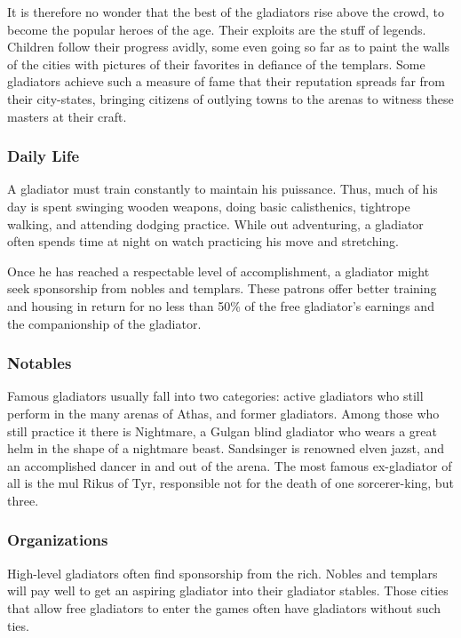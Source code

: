 It is therefore no wonder that the best of the gladiators rise above the crowd, to become the popular heroes of the age. Their exploits are the stuff of legends. Children follow their progress avidly, some even going so far as to paint the walls of the cities with pictures of their favorites in defiance of the templars. Some gladiators achieve such a measure of fame that their reputation spreads far from their city-states, bringing citizens of outlying towns to the arenas to witness these masters at their craft.

\subsubsection{Daily Life}
A gladiator must train constantly to maintain his puissance. Thus, much of his day is spent swinging wooden weapons, doing basic calisthenics, tightrope walking, and attending dodging practice. While out adventuring, a gladiator often spends time at night on watch practicing his move and stretching.

Once he has reached a respectable level of accomplishment, a gladiator might seek sponsorship from nobles and templars. These patrons offer better training and housing in return for no less than 50\% of the free gladiator's earnings and the companionship of the gladiator.

\subsubsection{Notables}
Famous gladiators usually fall into two categories: active gladiators who still perform in the many arenas of Athas, and former gladiators. Among those who still practice it there is Nightmare, a Gulgan blind gladiator who wears a great helm in the shape of a nightmare beast. Sandsinger is renowned elven jazst, and an accomplished dancer in and out of the arena. The most famous ex-gladiator of all is the mul Rikus of Tyr, responsible not for the death of one sorcerer-king, but three.

\subsubsection{Organizations}
High-level gladiators often find sponsorship from the rich. Nobles and templars will pay well to get an aspiring gladiator into their gladiator stables. Those cities that allow free gladiators to enter the games often have gladiators without such ties.

